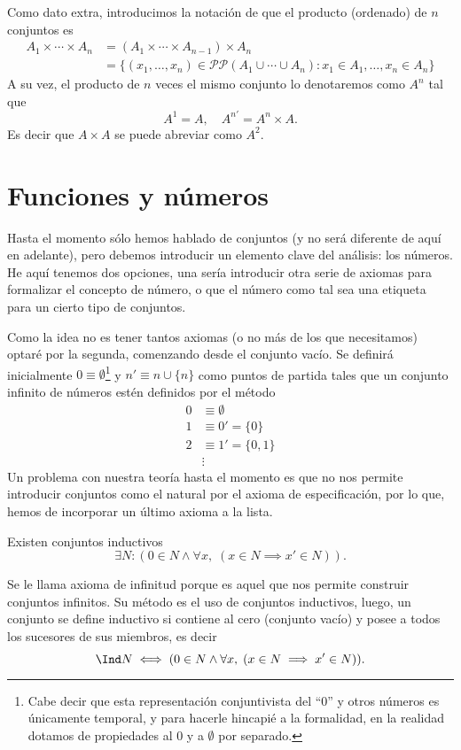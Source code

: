 \documentclass[11pt,oneside,a4paper]{book}
\renewcommand{\P}{\mathcal{P}}
\begin{document}
Como dato extra, introducimos la notación de que el producto (ordenado) de $n$ conjuntos es
$$
\begin{aligned}
A_1\times\cdots\times A_n&=(A_1\times\cdots\times A_{n-1})\times A_n\\
&=\{(x_1,\dots,x_n)\in\P\P(A_1\cup\cdots\cup A_n):x_1\in A_1,\dots,x_n\in A_n\}
\end{aligned}
$$
A su vez, el producto de $n$ veces el mismo conjunto lo denotaremos como $A^n$ tal que
$$A^{1}=A,\quad A^{n'}=A^{n}\times A.$$
Es decir que $A\times A$ se puede abreviar como $A^2$.

\section{Funciones y números}
Hasta el momento sólo hemos hablado de conjuntos (y no será diferente de aquí en adelante), pero debemos introducir un elemento clave del análisis: los números. He aquí tenemos dos opciones, una sería introducir otra serie de axiomas para formalizar el concepto de número, o que el número como tal sea una etiqueta para un cierto tipo de conjuntos.

Como la idea no es tener tantos axiomas (o no más de los que necesitamos) optaré por la segunda, comenzando desde el conjunto vacío. Se definirá inicialmente $0\equiv\emptyset$\footnote{Cabe decir que esta representación conjuntivista del ``0'' y otros números es únicamente temporal, y para hacerle hincapié a la formalidad, en la realidad dotamos de propiedades al 0 y a $\emptyset$ por separado.} y $n'\equiv n\cup\{n\}$ como puntos de partida tales que un conjunto infinito de números estén definidos por el método
\begin{align*}
0&\equiv\emptyset\\
1&\equiv 0'=\{0\}\\
2&\equiv 1'=\{0,1\}\\
&\vdots
\end{align*}
Un problema con nuestra teoría hasta el momento es que no nos permite introducir conjuntos como el natural por el axioma de especificación, por lo que, hemos de incorporar un último axioma a la lista.
\begin{axiom}[de Infinitud]
Existen conjuntos inductivos
$$\exists N:(0\in N\wedge\forall x,\;(x\in N\implies x'\in N)).$$
\end{axiom}
Se le llama axioma de infinitud porque es aquel que nos permite construir conjuntos infinitos. Su método es el uso de conjuntos inductivos, luego, un conjunto se define inductivo si contiene al cero (conjunto vacío) y posee a todos los sucesores de sus miembros, es decir
$$
\Ind N\iff(0\in N\wedge\forall x,\;(x\in N\implies x'\in N)).
$$
\end{document}
